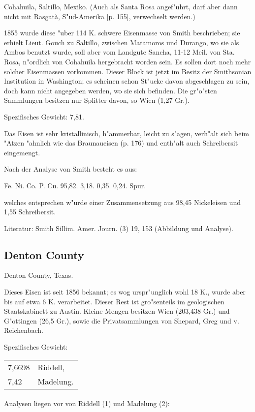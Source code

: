 \documentclass[a4paper, 11pt, oneside]{article}
\begin{document}
Cohahuila, Saltillo, Mexiko. (Auch als Santa Rosa angef"uhrt, darf aber dann nicht mit Rasgatà, S"ud-Amerika [p. 155], verwechselt werden.)

1855 wurde diese "uber 114 K. schwere Eisenmasse von Smith beschrieben; sie erhielt Lieut. Gouch zu Saltillo, zwischen Matamoros und Durango, wo sie als Ambos benutzt wurde, soll aber vom Landgute Sancha, 11-12 Meil. von Sta. Rosa, n"ordlich von Cohahuila hergebracht worden sein. Es sollen dort noch mehr solcher Eisenmassen vorkommen. Dieser Block ist jetzt im Besitz der Smithsonian Institution in Washington; es scheinen schon St"ucke davon abgeschlagen zu sein, doch kann nicht angegeben werden, wo sie sich befinden. Die gr"o"sten Sammlungen besitzen nur Splitter davon, so Wien (1,27 Gr.).

Spezifisches Gewicht: 7,81.

Das Eisen ist sehr kristallinisch, h"ammerbar, leicht zu s"agen, verh"alt sich beim "Atzen "ahnlich wie das Braunaueisen (p. 176) und enth"alt auch Schreibersit eingemengt.

Nach der Analyse von Smith besteht es aus:

Fe. Ni. Co. P. Cu.  
95,82. 3,18. 0,35. 0,24. Spur.

welches entsprechen w"urde einer Zusammensetzung aus 98,45 Nickeleisen und 1,55 Schreibersit.

Literatur: Smith Sillim. Amer. Journ. (3) 19, 153 (Abbildung und Analyse).

\subsection{Denton County}

Denton County, Texas.

Dieses Eisen ist seit 1856 bekannt; es wog urspr"unglich wohl 18 K., wurde aber bis auf etwa 6 K. verarbeitet. Dieser Rest ist gro"senteils im geologischen Staatskabinett zu Austin. Kleine Mengen besitzen Wien (203,438 Gr.) und G"ottingen (26,5 Gr.), sowie die Privatsammlungen von Shepard, Greg und v. Reichenbach.

Spezifisches Gewicht:  
\begin{table}[!ht]
    \centering
    \begin{tabular}{l l}
        7,6698 & Riddell,\\
        7,42 & Madelung.
    \end{tabular}
\end{table}
\paragraph{}
Analysen liegen vor von Riddell (1) und Madelung (2):
\end{document}
